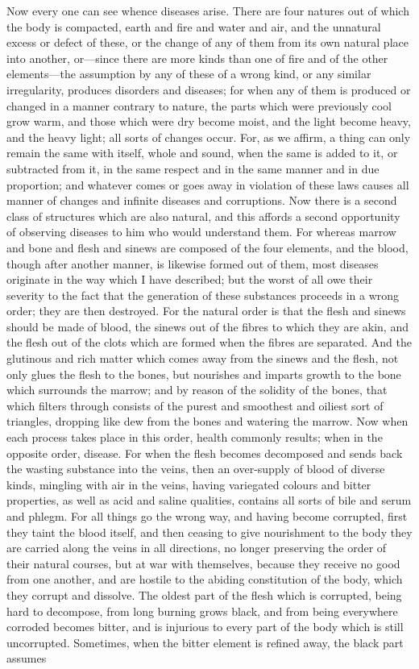 \documentclass[11pt,letter]{article}
\begin{document}
\par  Now every one can see whence diseases arise. There are four natures out of which the body is compacted, earth and fire and water and air, and the unnatural excess or defect of these, or the change of any of them from its own natural place into another, or—since there are more kinds than one of fire and of the other elements—the assumption by any of these of a wrong kind, or any similar irregularity, produces disorders and diseases; for when any of them is produced or changed in a manner contrary to nature, the parts which were previously cool grow warm, and those which were dry become moist, and the light become heavy, and the heavy light; all sorts of changes occur. For, as we affirm, a thing can only remain the same with itself, whole and sound, when the same is added to it, or subtracted from it, in the same respect and in the same manner and in due proportion; and whatever comes or goes away in violation of these laws causes all manner of changes and infinite diseases and corruptions. Now there is a second class of structures which are also natural, and this affords a second opportunity of observing diseases to him who would understand them. For whereas marrow and bone and flesh and sinews are composed of the four elements, and the blood, though after another manner, is likewise formed out of them, most diseases originate in the way which I have described; but the worst of all owe their severity to the fact that the generation of these substances proceeds in a wrong order; they are then destroyed. For the natural order is that the flesh and sinews should be made of blood, the sinews out of the fibres to which they are akin, and the flesh out of the clots which are formed when the fibres are separated. And the glutinous and rich matter which comes away from the sinews and the flesh, not only glues the flesh to the bones, but nourishes and imparts growth to the bone which surrounds the marrow; and by reason of the solidity of the bones, that which filters through consists of the purest and smoothest and oiliest sort of triangles, dropping like dew from the bones and watering the marrow. Now when each process takes place in this order, health commonly results; when in the opposite order, disease. For when the flesh becomes decomposed and sends back the wasting substance into the veins, then an over-supply of blood of diverse kinds, mingling with air in the veins, having variegated colours and bitter properties, as well as acid and saline qualities, contains all sorts of bile and serum and phlegm. For all things go the wrong way, and having become corrupted, first they taint the blood itself, and then ceasing to give nourishment to the body they are carried along the veins in all directions, no longer preserving the order of their natural courses, but at war with themselves, because they receive no good from one another, and are hostile to the abiding constitution of the body, which they corrupt and dissolve. The oldest part of the flesh which is corrupted, being hard to decompose, from long burning grows black, and from being everywhere corroded becomes bitter, and is injurious to every part of the body which is still uncorrupted. Sometimes, when the bitter element is refined away, the black part assumes 
\end{document}

